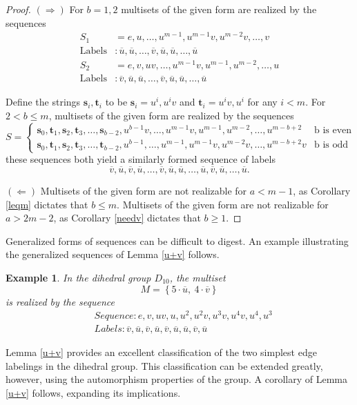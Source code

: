\documentclass[12pt]{article}
\newtheorem{exa}[thm]{Example}
\newcommand{\ba}{\[\begin{aligned}}
\newcommand{\ea}{\end{aligned}\]}
\newcommand{\setof}[1]{\left\{#1\right\}}
\newcommand{\ol}[1]{\overline{#1}} %
\newcommand{\bo}[1]{\textbf{#1}}%
\begin{document}
\begin{proof}
  $(\Rightarrow)$
  For $b = 1, 2$ multisets of the given form are
  realized by the sequences
  \ba
  S_1 &= e, u, \dots , u^{m-1}, u^{m-1}v, u^{m-2}v, \dots, v\\
  \text{Labels} &: \ol{u}, \ol{u}, \dots, \ol{v}, \ol{u}, \ol{u}, \dots, \ol{u}\\
  S_2 &= e, v, uv, \dots, u^{m-1}v, u^{m-1}, u^{m-2},\dots, u\\
  \text{Labels} &: \ol{v}, \ol{u}, \ol{u}, \dots, \ol{v}, \ol{u}, \ol{u}, \dots, \ol{u}
  \ea

  Define the strings $\bo{s}_i, \bo{t}_i$ to be $\bo{s}_i = u^i, u^iv$ and
  $\bo{t}_i = u^iv, u^i$ for any $i < m$. For $2 < b \leq m$, multisets
  of the given form are realized by the sequences
  $$
  S = \begin{cases}
    \bo{s}_0, \bo{t}_1, \bo{s}_2, \bo{t}_3, \dots, \bo{s}_{b-2}, u^{b-1}v, \dots, u^{m-1}v, u^{m-1}, u^{m-2}, \dots, u^{m-b+2} & \text{b is even}\\
    \bo{s}_0, \bo{t}_1, \bo{s}_2, \bo{t}_3, \dots, \bo{t}_{b-2}, u^{b-1}, \dots, u^{m-1}, u^{m-1}v, u^{m-2}v, \dots, u^{m-b+2}v & \text{b is odd}
  \end{cases}
  $$
  these sequences both yield a similarly formed sequence of labels
  $$ \ol{v}, \ol{u}, \ol{v}, \ol{u}, \dots, \ol{v}, \ol{u}, \ol{u}, \dots, \ol{u}, \ol{v}, \ol{u}, \dots, \ol{u}.$$

  $(\Leftarrow)$
  Multisets of the given form are not realizable for $a < m - 1$, as Corollary \ref{leqm}
  dictates that $b \leq m$. Multisets of the given form are not realizable for $a > 2m - 2$,
  as Corollary \ref{needv} dictates that $b \geq 1$.
\end{proof}

Generalized forms of sequences can be difficult to digest. An example illustrating the generalized sequences of Lemma
\ref{u+v} follows.

\begin{exa}
  In the dihedral group $D_{10}$, the multiset
  $$M = \setof{5 \cdot \ol{u},\ 4 \cdot \ol{v}}$$
  is realized by the sequence
  \ba
  &Sequence : e, v, uv, u, u^2, u^2v, u^3v, u^4v, u^4, u^3\\
  &Labels : \ol{v}, \ol{u}, \ol{v}, \ol{u}, \ol{v}, \ol{u}, \ol{u}, \ol{v}, \ol{u}
  \ea
\end{exa}

Lemma \ref{u+v} provides an excellent classification of the two simplest edge labelings
in the dihedral group. This classification can be extended greatly, however, using the
automorphism properties of the group. A corollary of Lemma \ref{u+v} follows,
expanding its implications.
\end{document}
